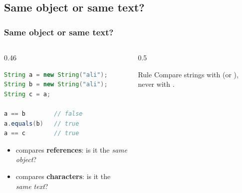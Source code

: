 \documentclass[aspectratio=169,10pt,compress]{beamer}
\begin{document}
\subsection[Same]{Same object or same text?}




\begin{frame}[t,fragile] \frametitle{Same object or same text?}
  \begin{columns}[T]
    \begin{column}{0.46\textwidth}


\begin{lstlisting}[style=codesnippet, language=Java]
String a = new String("ali");
String b = new String("ali");
String c = a;

a == b        // false
a.equals(b)   // true
a == c        // true
\end{lstlisting}


      \begin{itemize}\small
        \item \hCode{==} compares \textbf{references}: is it the \emph{same object}?
        \item {} compares \textbf{characters}: is it the \emph{same text}?
      \end{itemize}
    \end{column}
    \begin{column}{0.5\textwidth}
    
      \begin{center}
      \end{center}
      
      \begin{alertblock}{Rule}
        \small Compare strings with  (or ), 
        never with \hCode{==}.
      \end{alertblock}
    \end{column}
  \end{columns}
\end{frame}
\end{document}
